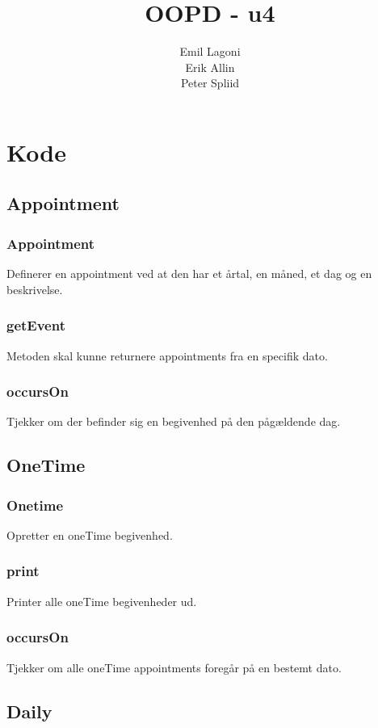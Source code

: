 \documentclass[a4paper,11pt]{article}
\title{\textbf{OOPD - u4}}
\author{Emil Lagoni\\Erik Allin\\Peter Spliid}
\begin{document}
\maketitle
\section*{Kode}
\subsection*{Appointment}
\subsubsection*{Appointment}
Definerer en appointment ved at den har et årtal, en måned, et dag og en beskrivelse.


\subsubsection*{getEvent}
Metoden skal kunne returnere appointments fra en specifik dato.


\subsubsection*{occursOn}
Tjekker om der befinder sig en begivenhed på den pågældende dag.



\subsection*{OneTime}
\subsubsection*{Onetime}
Opretter en oneTime begivenhed.

\subsubsection*{print}
Printer alle oneTime begivenheder ud.

\subsubsection*{occursOn}
Tjekker om alle oneTime appointments foregår på en bestemt dato.


\subsection*{Daily}
\end{document}
